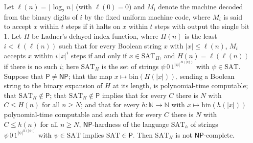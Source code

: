 \begin{theorem}
\label{Complexity.ladner_not_complete}
\leanok
{}
Let $\ell(n)=\lfloor\log_2 n\rfloor$ (with $\ell(0)=0$) and $M_i$ denote the machine decoded from the binary digits of $i$ by the fixed uniform machine code, where $M_i$ is said to accept $x$ within $t$ steps if it halts on $x$ within $t$ steps with output the single bit $1$. Let $H$ be Ladner's delayed index function, where $H(n)$ is the least $i<\ell(\ell(n))$ such that for every Boolean string $x$ with $|x|\le\ell(n)$, $M_i$ accepts $x$ within $i\,|x|^i$ steps if and only if $x\in\mathrm{SAT}_H$, and $H(n)=\ell(\ell(n))$ if there is no such $i$; here $\mathrm{SAT}_H$ is the set of strings $\psi\,0\,1^{|\psi|^{H(|\psi|)}}$ with $\psi\in\mathrm{SAT}$. Suppose that $\mathsf P\ne\mathsf{NP}$; that the map
$x\mapsto\mathrm{bin}(H(|x|))$, sending a Boolean string to the binary expansion of $H$ at its
length, is polynomial-time computable; that $\mathrm{SAT}_H\notin\mathsf P$;
that $\mathrm{SAT}_H\notin\mathsf P$ implies that for every $C$ there is $N$ with $C\le H(n)$ for
all $n\ge N$; and that for every $h:\mathbb N\to\mathbb N$ with $x\mapsto\mathrm{bin}(h(|x|))$
polynomial-time computable and such that for every $C$ there is $N$ with $C\le h(n)$ for all
$n\ge N$, $\mathsf{NP}$-hardness of the language
$\mathrm{SAT}_h$ of strings $\psi\,0\,1^{|\psi|^{h(|\psi|)}}$ with $\psi\in\mathrm{SAT}$ implies
$\mathrm{SAT}\in\mathsf P$. Then $\mathrm{SAT}_H$ is not $\mathsf{NP}$-complete.
\end{theorem}

